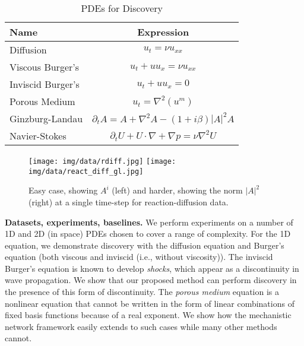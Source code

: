 \begin{table}[t] %
  \centering
  \vskip -0.1in
  \caption{PDEs for Discovery}
  \begin{footnotesize}
  \begin{tabular}{lc}
    \toprule
    Name & Expression\\
    \midrule
    Diffusion & $u_t = \nu u_{xx}$\\
    Viscous Burger's & $u_t + u u_x = \nu u_{xx}$\\
    Inviscid Burger's & $u_t + u u_x =0$\\
    Porous Medium & $u_t = \nabla^2 (u^m)$\\
    Ginzburg-Landau & $\partial_t A = A + \nabla^2 A - (1+i\beta)|A|^2A $\\
    Navier-Stokes &$\partial_t U + U\cdot \nabla + \nabla p = \nu \nabla^2 U$\\
    \bottomrule
  \end{tabular}
  \label{tab:pdes}
  \end{footnotesize}%
  \vskip -0.15in
\end{table}
\begin{figure}
\centering
  \vskip -0.05in
    \texttt{[image: img/data/rdiff.jpg]}
    \texttt{[image: img/data/react\_diff\_gl.jpg]}
  \label{fig:img-reactdiff}
  \vskip -0.15in
  \caption{Easy case, showing $A^i$ (left) and harder, showing the norm $|A|^2$ (right) at a single time-step for reaction-diffusion data.}
  \vskip -0.1in
\end{figure}
\textbf{Datasets, experiments, baselines.}
We perform experiments on a number of 1D and 2D (in space) PDEs chosen to cover a range of complexity.
For the 1D equation, we demonstrate discovery with the diffusion equation and Burger's equation (both viscous and inviscid (i.e., without viscosity)).
The inviscid Burger's equation is known to develop \emph{shocks}, which appear as a discontinuity in wave propagation.
We show that our proposed method can perform discovery in the presence of this form of discontinuity.
The \emph{porous medium} equation is a nonlinear equation that cannot be written in the form of linear combinations of fixed basis functions because of a real exponent.
We show how the mechanistic network framework easily extends to such cases while many other methods cannot.

